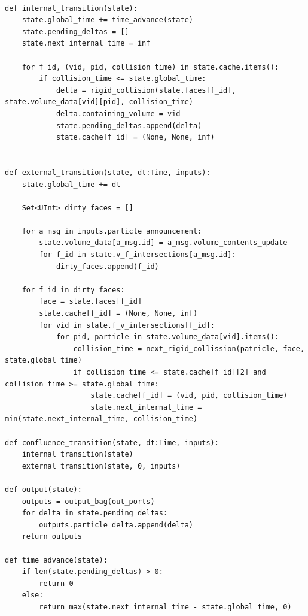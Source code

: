 \documentclass[conference]{IEEEtran}
\begin{document}
\begin{lstlisting}[style=Python]
	
def internal_transition(state):
	state.global_time += time_advance(state)
	state.pending_deltas = []
	state.next_internal_time = inf
	
	for f_id, (vid, pid, collision_time) in state.cache.items():
		if collision_time <= state.global_time:
			delta = rigid_collision(state.faces[f_id], state.volume_data[vid][pid], collision_time)
			delta.containing_volume = vid
			state.pending_deltas.append(delta)
			state.cache[f_id] = (None, None, inf)
	
	
def external_transition(state, dt:Time, inputs):
	state.global_time += dt
	
	Set<UInt> dirty_faces = []
	
	for a_msg in inputs.particle_announcement:
		state.volume_data[a_msg.id] = a_msg.volume_contents_update
		for f_id in state.v_f_intersections[a_msg.id]:
			dirty_faces.append(f_id)
	
	for f_id in dirty_faces:
		face = state.faces[f_id]
		state.cache[f_id] = (None, None, inf)
		for vid in state.f_v_intersections[f_id]:
			for pid, particle in state.volume_data[vid].items():
				collision_time = next_rigid_collission(patricle, face, state.global_time)
				if collision_time <= state.cache[f_id][2] and collision_time >= state.global_time:
					state.cache[f_id] = (vid, pid, collision_time)
					state.next_internal_time = min(state.next_internal_time, collision_time)
	
def confluence_transition(state, dt:Time, inputs):
	internal_transition(state)
	external_transition(state, 0, inputs)
	
def output(state):
	outputs = output_bag(out_ports)
	for delta in state.pending_deltas:
		outputs.particle_delta.append(delta)
	return outputs
	
def time_advance(state):
	if len(state.pending_deltas) > 0:
		return 0
	else:
		return max(state.next_internal_time - state.global_time, 0)
	
\end{lstlisting}
\end{document}
